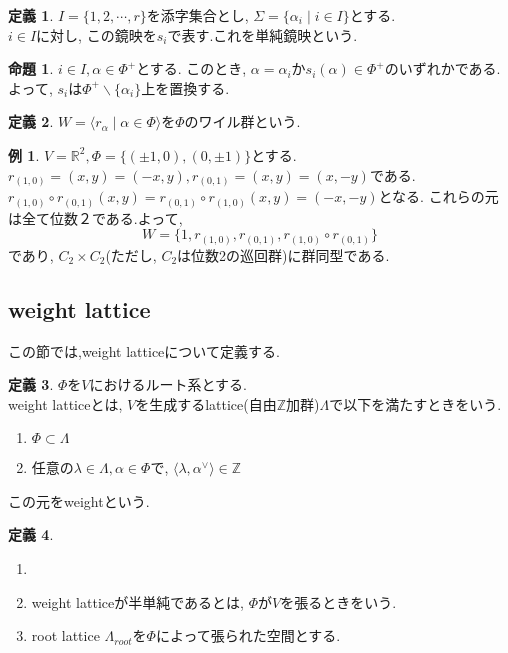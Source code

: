 \documentclass[a4,12pt, titlepage]{jarticle}
\theoremstyle{definition}
\newtheorem{df}{定義}
\newtheorem{prop}[thm]{命題}
\newtheorem*{ex}{例}
\begin{document}
\begin{df}
  $I = \{ 1, 2, \cdots, r \}$を添字集合とし, $\Sigma = \{ \alpha_i \mid i \in I \}$とする. \\
  $ i \in I $に対し, この鏡映を$s_i$で表す.これを単純鏡映という.
\end{df}

\begin{prop}
  $ i \in I, \alpha \in \Phi^{+}$とする. このとき,
  $\alpha = \alpha_i$か$s_i(\alpha) \in \Phi^{+}$のいずれかである. \\
  よって, $s_i$は$\Phi^{+} \backslash \{ \alpha_i\} $上を置換する.
\end{prop}

\begin{df}
  $W = \langle r_\alpha \mid \alpha \in \Phi \rangle $を$\Phi$のワイル群という.
\end{df}

\begin{ex}
  $V = \mathbb{R}^2, \Phi = \{ (\pm 1, 0), (0, \pm 1) \}$とする. \\
  $r_{ (1, 0)} =(x, y) = (-x, y), r_{ (0 ,1)} =(x, y) = (x, -y)$である.
  $r_{ (1, 0)} \circ r_{ (0 ,1)}(x, y) = r_{ (0, 1)} \circ r_{ (1 ,0)}(x, y) = (-x, -y)$となる.
  これらの元は全て位数２である.よって, 
  $$ W = \{ 1, r_{ (1, 0)}, r_{ (0 ,1)}, r_{ (1, 0)} \circ r_{ (0 ,1)} \}$$
  であり, $C_2 \times C_2 $(ただし, $C_2$は位数2の巡回群)に群同型である.
\end{ex}

\subsection{weight lattice}
  この節では,weight latticeについて定義する.
\bigskip

\begin{df}
  $\Phi$を$V$におけるルート系とする. \\
  weight latticeとは, $V$を生成するlattice(自由$\mathbb{Z}$加群)$\Lambda$で以下を満たすときをいう.
  \begin{enumerate}
    \item $\Phi \subset \Lambda $
    \item 任意の$ \lambda \in \Lambda, \alpha \in \Phi $で, $ \langle \lambda, \alpha^{ \vee } \rangle \in \mathbb{Z} $
  \end{enumerate}
  この元をweightという.
\end{df}

\begin{df}
  \begin{enumerate}
    \item[]
    \item weight latticeが半単純であるとは, $\Phi$が$V$を張るときをいう.
    \item root lattice $\Lambda_{ root }$を$\Phi$によって張られた空間とする.
  \end{enumerate}
\end{df}
\end{document}

